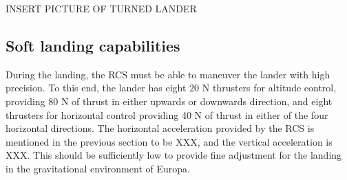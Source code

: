 					INSERT PICTURE OF TURNED LANDER\\


\subsection{Soft landing capabilities}

During the landing, the RCS must be able to maneuver the lander with high precision. To this end, the lander has eight 20 N thrusters for altitude control, providing 80 N of thrust in either upwards or downwards direction, and eight thrusters for horizontal control providing 40 N of thrust in either of the four horizontal directions. The horizontal acceleration provided by the RCS is mentioned in the previous section to be XXX, and the vertical acceleration is XXX. This should be sufficiently low to provide fine adjustment for the landing in the gravitational environment of Europa.
